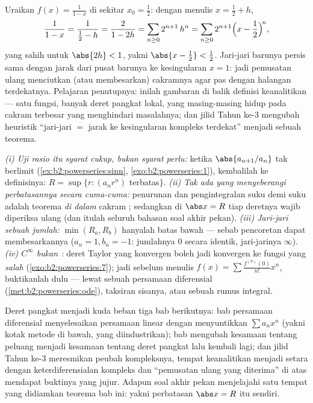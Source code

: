 \begin{example}\label{ex:b2:powerseries:recenter}
Uraikan $f(x) = \frac{1}{1-x}$ di sekitar $x_0 = \frac12$: dengan
menulis $x = \frac12 + h$,
\[
\frac{1}{1 - x} = \frac{1}{\frac12 - h}
= \frac{2}{1 - 2h}
= \sum_{n\geq0} 2^{n+1}\,h^n
= \sum_{n\geq0} 2^{n+1}\Bigl(x - \frac12\Bigr)^{\!n},
\]
yang sahih untuk $\abs{2h} < 1$, yakni $\abs{x - \frac12} < \frac12$.
Jari-jari barunya persis sama dengan jarak dari pusat barunya ke
kesingularan $x = 1$: jadi pemusatan ulang menciutkan (atau membesarkan)
cakramnya agar pas dengan halangan terdekatnya. Pelajaran penutupnya:
inilah gambaran di balik definisi keanalitikan --- satu
fungsi, banyak deret pangkat lokal, yang masing-masing hidup pada cakram
terbesar yang menghindari masalahnya; dan jilid Tahun ke-3 mengubah
heuristik ``jari-jari $=$ jarak ke kesingularan kompleks terdekat''
menjadi sebuah teorema.
\end{example}

\begin{remark}
\emph{(i) Uji rasio itu syarat cukup, bukan syarat perlu:} ketika
$\abs{a_{n+1}/a_n}$ tak berlimit
(\cref{ex:b2:powerseries:sinn}, \cref{exo:b2:powerseries:1}),
kembalilah ke definisinya: $R = \sup\{r : (a_nr^n)$
terbatas$\}$. \emph{(ii) Tak ada yang menyeberangi perbatasannya secara
cuma-cuma:} penurunan dan pengintegralan suku demi suku adalah teorema
\emph{di dalam} cakram ; sedangkan di $\abs x = R$ tiap
deretnya wajib diperiksa ulang (dan itulah seluruh bahasan soal akhir
pekan). \emph{(iii) Jari-jari sebuah jumlah:} $\min(R_a, R_b)$
hanyalah batas bawah --- sebab pencoretan dapat membesarkannya ($a_n =
1, b_n = -1$: jumlahnya $0$ secara identik, jari-jarinya $\infty$).
\emph{(iv) $C^\infty$ bukan :} deret Taylor yang konvergen
boleh jadi konvergen ke fungsi yang \emph{salah}
(\cref{exo:b2:powerseries:7}); jadi sebelum menulis $f(x) = \sum
\frac{f^{(n)}(0)}{n!}x^n$, buktikanlah dulu --- lewat sebuah persamaan
diferensial (\cref{met:b2:powerseries:ode}), taksiran sisanya, atau
sebuah rumus integral.
\end{remark}

\begin{remark}
Deret pangkat menjadi kuda beban tiga bab berikutnya: bab
persamaan diferensial menyelesaikan persamaan linear dengan menyuntikkan
$\sum a_nx^n$ (yakni kotak metode di bawah, yang diindustrikan); bab
 mengubah kesamaan tentang
peluang menjadi kesamaan tentang deret pangkat lalu kembali lagi; dan
jilid Tahun ke-3 meresmikan peubah kompleksnya, tempat
keanalitikan menjadi setara dengan keterdiferensialan kompleks dan
``pemusatan ulang yang diterima'' di atas mendapat buktinya yang jujur.
Adapun soal akhir pekan menjelajahi satu tempat yang didiamkan teorema
bab ini: yakni perbatasan $\abs x = R$ itu sendiri.
\end{remark}

